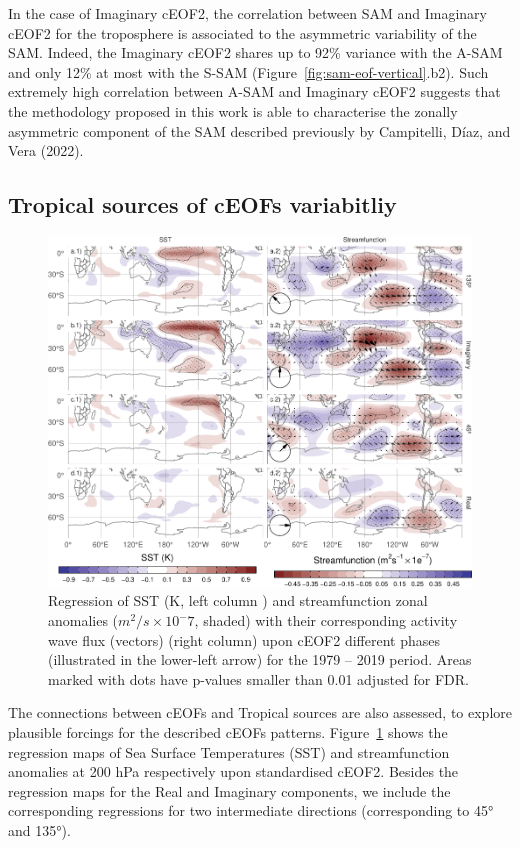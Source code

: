 \documentclass[smallextended]{svjour3}       %
\begin{document}
In the case of Imaginary cEOF2, the correlation between SAM and Imaginary cEOF2 for the troposphere is associated to the asymmetric variability of the SAM.
Indeed, the Imaginary cEOF2 shares up to 92\% variance with the A-SAM and only 12\% at most with the S-SAM (Figure~\ref{fig:sam-eof-vertical}.b2).
Such extremely high correlation between A-SAM and Imaginary cEOF2 suggests that the methodology proposed in this work is able to characterise the zonally asymmetric component of the SAM described previously by Campitelli, Díaz, and Vera (2022).

\hypertarget{tropical}{%
\subsection{Tropical sources of cEOFs variabitliy}\label{tropical}}

\begin{figure}
\includegraphics{../figures/sst-psi-2-1} \caption{Regression of SST (K, left column ) and streamfunction zonal anomalies (\(m^2/s\times10^-7\), shaded) with their corresponding activity wave flux (vectors) (right column) upon cEOF2 different phases (illustrated in the lower-left arrow) for the 1979 -- 2019 period. Areas marked with dots have p-values smaller than 0.01 adjusted for FDR.}\label{fig:sst-psi-2}
\end{figure}



The connections between cEOFs and Tropical sources are also assessed, to explore plausible forcings for the described cEOFs patterns.
Figure~\ref{fig:sst-psi-2} shows the regression maps of Sea Surface Temperatures (SST) and streamfunction anomalies at 200 hPa respectively upon standardised cEOF2.
Besides the regression maps for the Real and Imaginary components, we include the corresponding regressions for two intermediate directions (corresponding to 45° and 135°).
\end{document}
